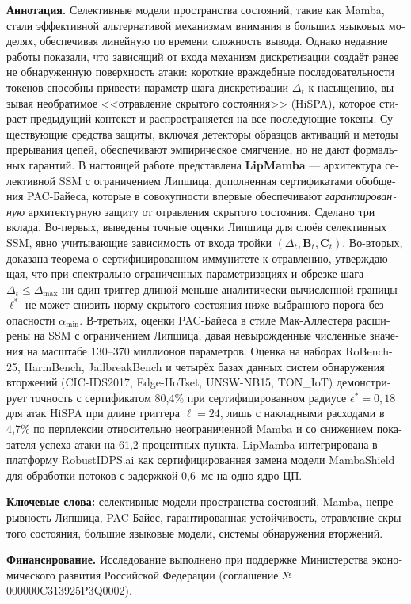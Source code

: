 \documentclass[12pt,a4paper]{article}
\theoremstyle{definition}
\theoremstyle{remark}
\begin{document}
\begin{otherlanguage}{russian}
\noindent\textbf{Аннотация.} Селективные модели пространства состояний, такие как Mamba, стали эффективной альтернативой механизмам внимания в больших языковых моделях, обеспечивая линейную по времени сложность вывода. Однако недавние работы показали, что зависящий от входа механизм дискретизации создаёт ранее не обнаруженную поверхность атаки: короткие враждебные последовательности токенов способны привести параметр шага дискретизации $\Delta_t$ к насыщению, вызывая необратимое <<отравление скрытого состояния>> (HiSPA), которое стирает предыдущий контекст и распространяется на все последующие токены. Существующие средства защиты, включая детекторы образцов активаций и методы прерывания цепей, обеспечивают эмпирическое смягчение, но не дают формальных гарантий. В настоящей работе представлена \textbf{LipMamba} --- архитектура селективной SSM с ограничением Липшица, дополненная сертификатами обобщения PAC-Байеса, которые в совокупности впервые обеспечивают \emph{гарантированную} архитектурную защиту от отравления скрытого состояния. Сделано три вклада. Во-первых, выведены точные оценки Липшица для слоёв селективных SSM, явно учитывающие зависимость от входа тройки $(\Delta_t, \mathbf{B}_t, \mathbf{C}_t)$. Во-вторых, доказана теорема о сертифицированном иммунитете к отравлению, утверждающая, что при спектрально-ограниченных параметризациях и обрезке шага $\Delta_t \leq \Delta_{\max}$ ни один триггер длиной меньше аналитически вычисленной границы $\ell^*$ не может снизить норму скрытого состояния ниже выбранного порога безопасности $\alpha_{\min}$. В-третьих, оценки PAC-Байеса в стиле Мак-Аллестера расширены на SSM с ограничением Липшица, давая невырожденные численные значения на масштабе 130--370 миллионов параметров. Оценка на наборах RoBench-25, HarmBench, JailbreakBench и четырёх базах данных систем обнаружения вторжений (CIC-IDS2017, Edge-IIoTset, UNSW-NB15, TON\_IoT) демонстрирует точность с сертификатом 80,4\% при сертифицированном радиусе $\epsilon^*=0{,}18$ для атак HiSPA при длине триггера $\ell=24$, лишь с накладными расходами в 4,7\% по перплексии относительно неограниченной Mamba и со снижением показателя успеха атаки на 61,2 процентных пункта. LipMamba интегрирована в платформу RobustIDPS.ai как сертифицированная замена модели MambaShield для обработки потоков с задержкой 0,6~мс на одно ядро ЦП.

\vspace{0.4em}

\noindent\textbf{Ключевые слова:} селективные модели пространства состояний, Mamba, непрерывность Липшица, PAC-Байес, гарантированная устойчивость, отравление скрытого состояния, большие языковые модели, системы обнаружения вторжений.

\vspace{0.4em}

\noindent\textbf{Финансирование.} Исследование выполнено при поддержке Министерства экономического развития Российской Федерации (соглашение № 000000C313925P3Q0002).
\end{otherlanguage}
\end{document}
